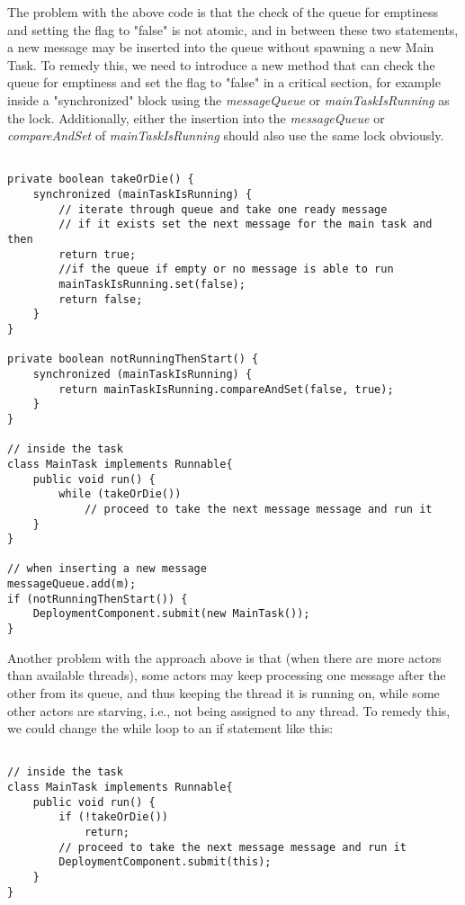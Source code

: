 The problem with the above code is that the check of the queue for emptiness and setting the flag to "false" is not atomic, and in between these two statements, a new message may be inserted into the queue without spawning a new Main Task. To remedy this, we need to introduce a new method that can check the queue for emptiness and set the flag to "false" in a critical section, for example inside a "synchronized" block using the \textit{messageQueue} or \textit{mainTaskIsRunning} as the lock. Additionally, either the insertion into the \textit{messageQueue} or \textit{compareAndSet} of \textit{mainTaskIsRunning} should also use the same lock obviously.

\begin{lstlisting}[caption= Complete Synchronization for the Demand-Driven Approach]

private boolean takeOrDie() {
	synchronized (mainTaskIsRunning) {
		// iterate through queue and take one ready message 
		// if it exists set the next message for the main task and then
		return true;
		//if the queue if empty or no message is able to run
		mainTaskIsRunning.set(false);
		return false;
	}
}

private boolean notRunningThenStart() {
	synchronized (mainTaskIsRunning) {
		return mainTaskIsRunning.compareAndSet(false, true);
	}
}

// inside the task
class MainTask implements Runnable{
	public void run() {
		while (takeOrDie())
			// proceed to take the next message message and run it	 
	}
}

// when inserting a new message
messageQueue.add(m);
if (notRunningThenStart()) {
	DeploymentComponent.submit(new MainTask());
}
\end{lstlisting}

Another problem with the approach above is that (when there are more actors than available threads), some actors may keep processing one message after the other from its queue, and thus keeping the thread it is running on, while some other actors are starving, i.e., not being assigned to any thread. To remedy this, we could change the while loop to an if statement like this:

\begin{lstlisting}[caption= Fairness Between Actors]

// inside the task
class MainTask implements Runnable{
	public void run() {
		if (!takeOrDie())
			return;
		// proceed to take the next message message and run it	 
		DeploymentComponent.submit(this);
	}
}
\end{lstlisting}





